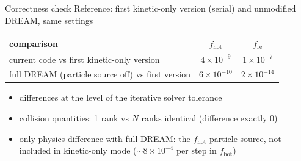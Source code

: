 \begin{frame}{Correctness check}
    Reference: first kinetic-only version (serial) and unmodified DREAM, same settings
    \vspace{0.5em}
    \begin{center}
    \begin{tabular}{lcc}
        \hline
        comparison & $f_\mathrm{hot}$ & $f_\mathrm{re}$ \\
        \hline
        current code vs first kinetic-only version & $4\times10^{-9}$ & $1\times10^{-7}$ \\
        full DREAM (particle source off) vs first version & $6\times10^{-10}$ & $2\times10^{-14}$ \\
        \hline
    \end{tabular}
    \end{center}
    \vspace{0.5em}
    \begin{itemize}
        \item differences at the level of the iterative solver tolerance
        \item collision quantities: 1 rank vs $N$ ranks identical (difference exactly 0)
        \item only physics difference with full DREAM: the $f_\mathrm{hot}$ particle source,
              not included in kinetic-only mode ($\sim 8\times10^{-4}$ per step in $f_\mathrm{hot}$)
    \end{itemize}
\end{frame}

